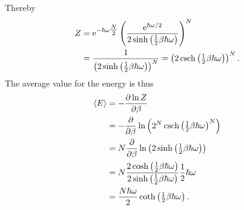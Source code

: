 \documentclass[a4paper,10pt]{article}
\numberwithin{equation}{section}
\begin{document}
\begin{multicols}{2}
Thereby
\begin{align} 
  Z &= \text{e}^{-\hbar \omega \tfrac{N}{2}}\left(\dfrac{\text{e}^{\hbar \omega /2}}{2\sinh \left(\tfrac{1}{2}\beta \hbar \omega \right)}\right)^N\\
    &= \dfrac{1}{\left(2\sinh \left(\tfrac{1}{2}\beta \hbar \omega \right)\right)^N} = \left(2\csch \left(\tfrac{1}{2}\beta \hbar \omega \right)\right)^N
.\end{align} 
The average value for the energy is thus
\begin{align} 
  \left\langle E\right\rangle  &= -\diffp[]{\ln Z}{\beta }\\
                               &= -\diffp*[]{\ln \left(2^N\csch\left(\tfrac{1}{2}\beta \hbar \omega \right)^N\right)}{\beta }\\
                               &= N\diffp*[]{\ln\left(2\sinh \left(\tfrac{1}{2}\beta \hbar \omega \right)\right)}{\beta }\\
                               &= N\dfrac{2\cosh \left(\tfrac{1}{2}\beta \hbar \omega \right)}{2\sinh \left(\tfrac{1}{2}\beta \hbar \omega \right)}\dfrac{1}{2}\hbar \omega \\
                               &= \dfrac{N\hbar \omega }{2}\coth \left(\tfrac{1}{2}\beta \hbar \omega  \right)
.\end{align} 


\end{multicols}
\end{document}
